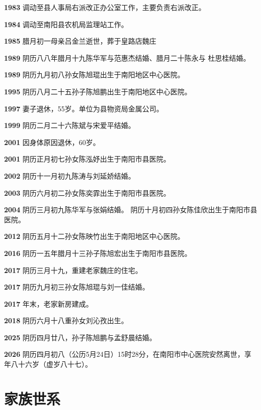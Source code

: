 \textbf{1983} 调动至县人事局右派改正办公室工作，主要负责右派改正。

\textbf{1984} 调动至南阳县农机局监理站工作。

\textbf{1985} 腊月初一母亲吕金兰逝世，葬于皇路店魏庄

\textbf{1989} 阴历八八年腊月十九陈华军与范惠杰结婚、腊月二十陈永与 杜思桂结婚。

\textbf{1989} 阴历九月初八孙女陈旭琨出生于南阳地区中心医院。

\textbf{1995} 阴历八月二十五孙子陈旭鹏出生于南阳地区中心医院。

\textbf{1997} 妻子退休，55岁。单位为县物资局金属公司。

\textbf{1999} 阴历二月二十六陈斌与宋爱平结婚。

\textbf{2001} 因身体原因退休，60岁。

\textbf{2001} 阴历正月初七孙女陈泓妤出生于南阳市县医院。

\textbf{2002} 阴历十一月初九陈涛与刘延娇结婚。

\textbf{2003} 阴历六月初二孙女陈奕霏出生于南阳市县医院。

\textbf{2004} 阴历三月初九陈华军与张娟结婚。 阴历十月初四孙女陈佳欣出生于南阳市县医院。

\textbf{2012} 阴历五月十二孙女陈映竹出生于南阳地区中心医院。

\textbf{2016} 阴历一五年腊月十三孙子陈旭宏出生于南阳市县医院。

\textbf{2017} 阴历三月十九，重建老家魏庄的住宅。

\textbf{2017} 阴历九月初三孙女陈旭琨与刘一佳结婚。

\textbf{2017} 年末，老家新房建成。

\textbf{2018} 阴历六月十八重孙女刘沁孜出生。

\textbf{2025} 阴历四月廿八，孙子陈旭鹏与孟舒晨结婚。

\textbf{2026} 阴历四月初八（公历5月24日）15时28分，在南阳市中心医院安然离世，享年八十六岁（虚岁八十七）。


\iffalse
\clearpage
\thispagestyle{plain}
\section*{家\hspace{1em}族\hspace{1em}世\hspace{1em}系}

\vspace{0.6em}

